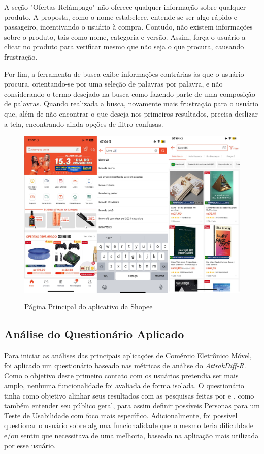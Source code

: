 A seção "Ofertas Relâmpago" não oferece qualquer informação sobre qualquer produto. A proposta, como o nome estabelece, entende-se ser algo rápido e passageiro, incentivando o usuário à compra. Contudo, não existem informações sobre o produto, tais como nome, categoria e versão. Assim, força o usuário a clicar no produto para verificar mesmo que não seja o que procura, causando frustração.

Por fim, a ferramenta de busca exibe informações contrárias às que o usuário procura, orientando-se por uma seleção de palavras por palavra, e não considerando o termo desejado na busca como fazendo parte de uma composição de palavras. Quando realizada a busca, novamente mais frustração para o usuário que, além de não encontrar o que deseja nos primeiros resultados, precisa deslizar a tela, encontrando ainda opções de filtro confusas.

\begin{figure}[ht]
    \centering
    \caption{Página Principal do aplicativo da Shopee}
    \includegraphics[keepaspectratio=true,scale=0.2]{figuras/shopee1.PNG}
    \label{s5}
\end{figure}

\subsection{Análise do Questionário Aplicado}
    \label{AnaliseAttrakDiffR}

Para iniciar as análises das principais aplicações de Comércio Eletrônico Móvel, foi aplicado um questionário baseado nas métricas de análise do \textit{AttrakDiff-R}. Como o objetivo deste primeiro contato com os usuários pretendia ser mais amplo, nenhuma funcionalidade foi avaliada de forma isolada. O questionário tinha como objetivo alinhar seus resultados com as pesquisas feitas por  e , como também entender seu público geral, para assim definir possíveis Personas para um Teste de Usabilidade com foco mais específico. Adicionalmente, foi possível questionar o usuário sobre alguma funcionalidade que o mesmo teria dificuldade e/ou sentiu que necessitava de uma melhoria, baseado na aplicação mais utilizada por esse usuário.

